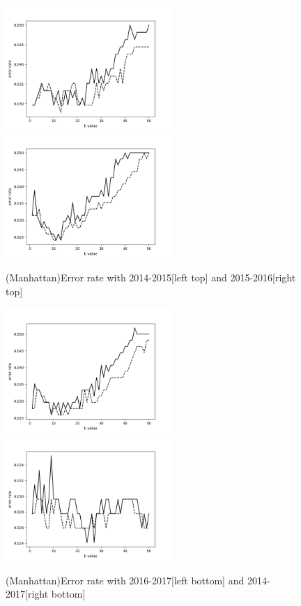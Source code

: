 \documentclass{article}
\begin{document}
\begin{figure}
  \centering
  \includegraphics[width=6.3cm]{knn_err14_ma.png}
  \includegraphics[width=6.3cm]{knn_err15_ma.png}
  \caption{(Manhattan)Error rate with 2014-2015[left top] and 2015-2016[right top]}
  \includegraphics[width=6.3cm]{knn_err16_ma.png}
  \includegraphics[width=6.3cm]{knn_errall_ma.png}
  \caption{(Manhattan)Error rate with 2016-2017[left bottom] and 2014-2017[right bottom]}
\end{figure}
\end{document}
